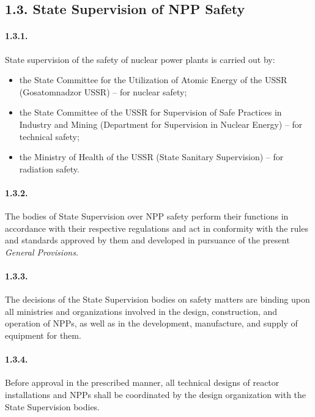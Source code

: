 \documentclass[openright]{bookest}
\begin{document}
\subsection*{1.3. State Supervision of NPP Safety}

\paragraph{1.3.1.}
State supervision of the safety of nuclear power plants is carried out by:

\begin{itemize}
    \item the State Committee for the Utilization of Atomic Energy of the USSR (Gosatomnadzor USSR) -- for nuclear safety;
    \item the State Committee of the USSR for Supervision of Safe Practices in Industry and Mining (Department for Supervision in Nuclear Energy) -- for technical safety;
    \item the Ministry of Health of the USSR (State Sanitary Supervision) -- for radiation safety.
\end{itemize}

\paragraph{1.3.2.}
The bodies of State Supervision over NPP safety perform their functions in accordance with their respective regulations and act in conformity with the rules and standards approved by them and developed in pursuance of the present \textit{General Provisions}.

\paragraph{1.3.3.}
The decisions of the State Supervision bodies on safety matters are binding upon all ministries and organizations involved in the design, construction, and operation of NPPs, as well as in the development, manufacture, and supply of equipment for them.

\paragraph{1.3.4.}
Before approval in the prescribed manner, all technical designs of reactor installations and NPPs shall be coordinated by the design organization with the State Supervision bodies.
\end{document}
